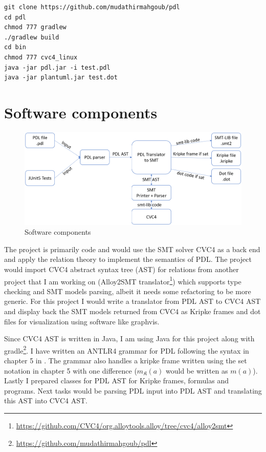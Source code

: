 \documentclass[12pt,a4paper]{article}
\begin{document}
\begin{verbatim}
git clone https://github.com/mudathirmahgoub/pdl
cd pdl
chmod 777 gradlew
./gradlew build
cd bin
chmod 777 cvc4_linux
java -jar pdl.jar -i test.pdl 
java -jar plantuml.jar test.dot
\end{verbatim}



\section{Software components}
\begin{figure}[H]
\center
\includegraphics[scale=0.3]{solver.png}
\caption{Software components}
\end{figure}


The project is primarily code and would use the SMT solver CVC4 as a back end and apply the relation theory to implement the semantics of PDL. The project would import CVC4 abstract syntax tree (AST) for relations from another project that I am working on (Alloy2SMT translator\footnote{\url{https://github.com/CVC4/org.alloytools.alloy/tree/cvc4/alloy2smt}}) which supports type checking and SMT models parsing, albeit it needs some refactoring to be more generic.  For this project I would write a translator from PDL AST to CVC4 AST and display back the SMT models returned from CVC4 as Kripke frames and dot files for visualization using software like graphvis.

Since CVC4 AST is written in Java, I am using Java for this project along with  gradle\footnote{\url{https://github.com/mudathirmahgoub/pdl}}. I have written an ANTLR4 grammar for PDL following the syntax in chapter 5 in \cite{dynamic}. The grammar also handles a kripke frame written using the set notation in chapter 5 with one difference ($m_{\mathfrak{K}}(a)$ would be written as $m(a)$). Lastly I  prepared classes for PDL AST for Kripke frames, formulas and programs. Next tasks would be parsing PDL input into PDL AST and translating this AST into CVC4 AST. 
\end{document}
